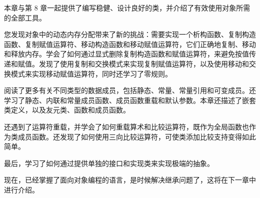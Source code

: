 本章与第 8 章一起提供了编写稳健、设计良好的类，并介绍了有效使用对象所需的全部工具。

您发现对象中的动态内存分配带来了新的挑战：需要实现一个析构函数、复制构造函数、复制赋值运算符、移动构造函数和移动赋值运算符，它们正确地复制、移动和释放内存。学会了如何通过显式删除复制构造函数和赋值运算符，来避免按值传递和赋值。发现了使用复制和交换模式来实现复制赋值运算符，以及使用移动和交换模式来实现移动赋值运算符，同时还学习了零规则。

阅读了更多有关不同类型的数据成员，包括静态、常量、常量引用和可变成员。还学习了静态、内联和常量成员函数、成员函数重载和默认参数。本章还描述了嵌套类定义，以及友元类、函数和成员函数。

还遇到了运算符重载，并学会了如何重载算术和比较运算符，既作为全局函数也作为类成员函数。还发现了如何使用三向比较运算符，可使类添加比较支持变得如此简单。

最后，学习了如何通过提供单独的接口和实现类来实现极端的抽象。

现在，已经掌握了面向对象编程的语言，是时候解决继承问题了，这将在下一章中进行介绍。